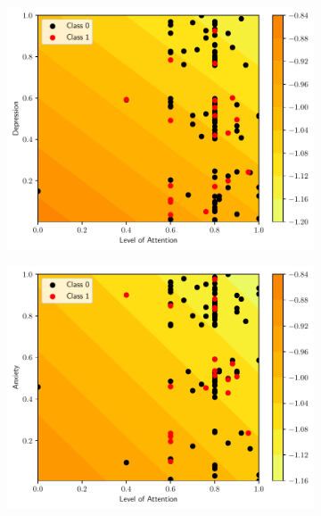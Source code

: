\begin{figure}
  \centering
  \begin{subfigure}[b]{0.32\textwidth}
    \centering
    \includegraphics[width=\textwidth]{figs/svm-linear-contour-0-3.pdf}
    \caption{}
    \label{fig:SVM-linear1a}
  \end{subfigure}
  \begin{subfigure}[b]{0.32\textwidth}
    \centering
    \includegraphics[width=\textwidth]{figs/svm-linear-contour-0-4.pdf}
    \caption{}
  \end{subfigure}
  \begin{subfigure}[b]{0.32\textwidth}

\end{subfigure}
\end{figure}
